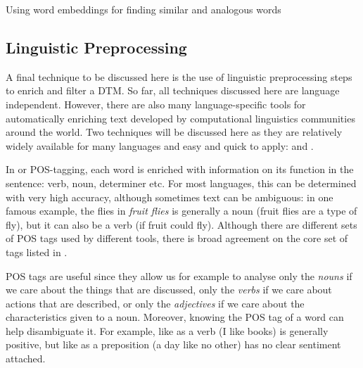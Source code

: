 \begin{ccsexample}
\caption{Using word embeddings for finding similar and analogous words}\label{ex:embedding}
\end{ccsexample}





\subsection{Linguistic Preprocessing}
\label{sec:nlp}

A final technique to be discussed here is the use of linguistic preprocessing steps to enrich and filter a DTM.
So far, all techniques discussed here are language independent.
However, there are also many language-specific tools for automatically enriching text developed by computational linguistics communities around the world.
Two techniques will be discussed here as they are relatively widely available for many languages and easy and quick to apply:  and .

In  or POS-tagging, each word is enriched with information on its function in the sentence: verb, noun, determiner etc.
For most languages, this can be determined with very high accuracy, although sometimes text can be ambiguous:
in one famous example, the flies in \emph{fruit flies} is generally a noun (fruit flies are a type of fly), but it can also be a verb (if fruit could fly). 
Although there are different sets of POS tags used by different tools, there is broad agreement on the core set of tags listed in .



POS tags are useful since they allow us for example to analyse only the \textit{nouns} if we care about the things that are discussed, only the \textit{verbs} if we care about actions that are described, or only the \textit{adjectives} if we care about the characteristics given to a noun.
Moreover, knowing the POS tag of a word can help disambiguate it.
For example, like as a verb (I like books) is generally positive, but like as a preposition (a day like no other) has no clear sentiment attached.


